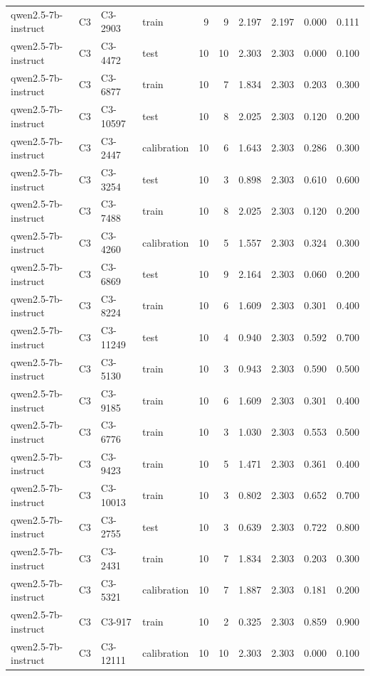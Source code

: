 \begin{table}
\begin{tabular}{llllrrrrrr}
qwen2.5-7b-instruct & C3 & C3-2903 & train & 9 & 9 & 2.197 & 2.197 & 0.000 & 0.111 \\
qwen2.5-7b-instruct & C3 & C3-4472 & test & 10 & 10 & 2.303 & 2.303 & 0.000 & 0.100 \\
qwen2.5-7b-instruct & C3 & C3-6877 & train & 10 & 7 & 1.834 & 2.303 & 0.203 & 0.300 \\
qwen2.5-7b-instruct & C3 & C3-10597 & test & 10 & 8 & 2.025 & 2.303 & 0.120 & 0.200 \\
qwen2.5-7b-instruct & C3 & C3-2447 & calibration & 10 & 6 & 1.643 & 2.303 & 0.286 & 0.300 \\
qwen2.5-7b-instruct & C3 & C3-3254 & test & 10 & 3 & 0.898 & 2.303 & 0.610 & 0.600 \\
qwen2.5-7b-instruct & C3 & C3-7488 & train & 10 & 8 & 2.025 & 2.303 & 0.120 & 0.200 \\
qwen2.5-7b-instruct & C3 & C3-4260 & calibration & 10 & 5 & 1.557 & 2.303 & 0.324 & 0.300 \\
qwen2.5-7b-instruct & C3 & C3-6869 & test & 10 & 9 & 2.164 & 2.303 & 0.060 & 0.200 \\
qwen2.5-7b-instruct & C3 & C3-8224 & train & 10 & 6 & 1.609 & 2.303 & 0.301 & 0.400 \\
qwen2.5-7b-instruct & C3 & C3-11249 & test & 10 & 4 & 0.940 & 2.303 & 0.592 & 0.700 \\
qwen2.5-7b-instruct & C3 & C3-5130 & train & 10 & 3 & 0.943 & 2.303 & 0.590 & 0.500 \\
qwen2.5-7b-instruct & C3 & C3-9185 & train & 10 & 6 & 1.609 & 2.303 & 0.301 & 0.400 \\
qwen2.5-7b-instruct & C3 & C3-6776 & train & 10 & 3 & 1.030 & 2.303 & 0.553 & 0.500 \\
qwen2.5-7b-instruct & C3 & C3-9423 & train & 10 & 5 & 1.471 & 2.303 & 0.361 & 0.400 \\
qwen2.5-7b-instruct & C3 & C3-10013 & train & 10 & 3 & 0.802 & 2.303 & 0.652 & 0.700 \\
qwen2.5-7b-instruct & C3 & C3-2755 & test & 10 & 3 & 0.639 & 2.303 & 0.722 & 0.800 \\
qwen2.5-7b-instruct & C3 & C3-2431 & train & 10 & 7 & 1.834 & 2.303 & 0.203 & 0.300 \\
qwen2.5-7b-instruct & C3 & C3-5321 & calibration & 10 & 7 & 1.887 & 2.303 & 0.181 & 0.200 \\
qwen2.5-7b-instruct & C3 & C3-917 & train & 10 & 2 & 0.325 & 2.303 & 0.859 & 0.900 \\
qwen2.5-7b-instruct & C3 & C3-12111 & calibration & 10 & 10 & 2.303 & 2.303 & 0.000 & 0.100 \\

\end{tabular}
\end{table}
